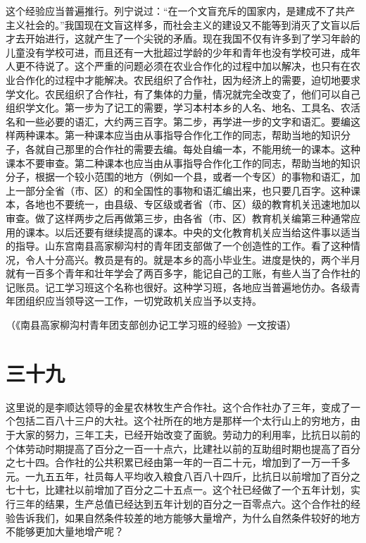 这个经验应当普遍推行。列宁说过：“在一个文盲充斥的国家内，是建成不了共产主义社会的。”我国现在文盲这样多，而社会主义的建设又不能等到消灭了文盲以后才去开始进行，这就产生了一个尖锐的矛盾。现在我国不仅有许多到了学习年龄的儿童没有学校可进，而且还有一大批超过学龄的少年和青年也没有学校可进，成年人更不待说了。这个严重的问题必须在农业合作化的过程中加以解决，也只有在农业合作化的过程中才能解决。农民组织了合作社，因为经济上的需要，迫切地要求学文化。农民组织了合作社，有了集体的力量，情况就完全改变了，他们可以自己组织学文化。第一步为了记工的需要，学习本村本乡的人名、地名、工具名、农活名和一些必要的语汇，大约两三百字。第二步，再学进一步的文字和语汇。要编这样两种课本。第一种课本应当由从事指导合作化工作的同志，帮助当地的知识分子，各就自己那里的合作社的需要去编。每处自编一本，不能用统一的课本。这种课本不要审查。第二种课本也应当由从事指导合作化工作的同志，帮助当地的知识分子，根据一个较小范围的地方（例如一个县，或者一个专区）的事物和语汇，加上一部分全省（市、区）的和全国性的事物和语汇编出来，也只要几百字。这种课本，各地也不要统一，由县级、专区级或者省（市、区）级的教育机关迅速地加以审查。做了这样两步之后再做第三步，由各省（市、区）教育机关编第三种通常应用的课本。以后还要有继续提高的课本。中央的文化教育机关应当给这件事以适当的指导。山东宫南县高家柳沟村的青年团支部做了一个创造性的工作。看了这种情况，令人十分高兴。教员是有的。就是本乡的高小毕业生。进度是快的，两个半月就有一百多个青年和壮年学会了两百多字，能记自己的工账，有些人当了合作社的记账员。记工学习班这个名称也很好。这种学习班，各地应当普遍地仿办。各级青年团组织应当领导这一工作，一切党政机关应当予以支持。


（《南县高家柳沟村青年团支部创办记工学习班的经验》一文按语）

\section*{三十九}

这里说的是李顺达领导的金星农林牧生产合作社。这个合作社办了三年，变成了一个包括二百八十三户的大社。这个社所在的地方是那样一个太行山上的穷地方，由于大家的努力，三年工夫，已经开始改变了面貌。劳动力的利用率，比抗日以前的个体劳动时期提高了百分之一百一十点六，比建社以前的互助组时期也提高了百分之七十四。合作社的公共积累已经由第一年的一百二十元，增加到了一万一千多元。一九五五年，社员每人平均收入粮食八百八十四斤，比抗日以前增加了百分之七十七，比建社以前增加了百分之二十五点一。这个社已经做了一个五年计划，实行三年的结果，生产总值已经达到五年计划的百分之一百零点六。这个合作社的经验告诉我们，如果自然条件较差的地方能够大量增产，为什么自然条件较好的地方不能够更加大量地增产呢？


